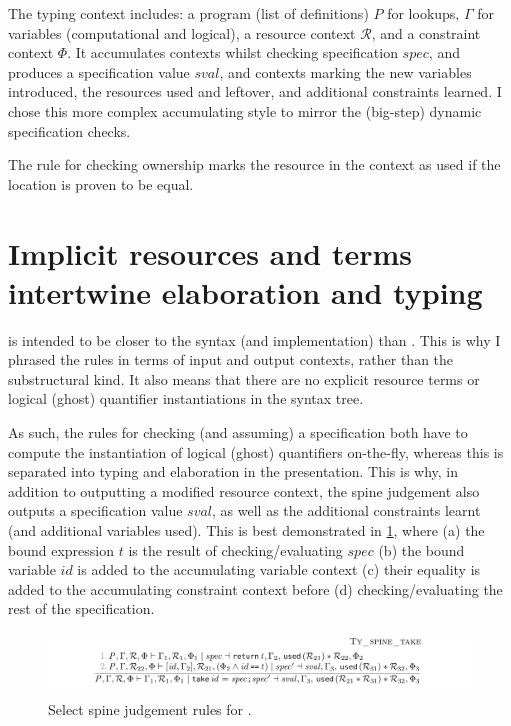 The typing context includes: a program (list of definitions) $P$ for lookups,
$\Gamma$ for variables (computational and logical), a resource context
$\mathcal{R}$, and a constraint context $\Phi$. It accumulates contexts whilst
checking specification $\mathit{spec}$, and produces a specification value
$\mathit{sval}$, and contexts marking the new variables introduced, the
resources used and leftover, and additional constraints learned. I chose this
more complex accumulating style to mirror the (big-step) dynamic specification
checks.

The rule for checking ownership marks the resource in the context as
used if the location is proven to be equal.

\section{Implicit resources and terms intertwine elaboration and typing}

 is intended to be closer to the syntax (and implementation)
than . This is why I phrased the rules in terms of input and
output contexts, rather than the substructural kind. It also means that there
are no explicit resource terms or logical (ghost) quantifier instantiations in
the syntax tree.

As such, the rules for checking (and assuming) a specification both have to
compute the instantiation of logical (ghost) quantifiers on-the-fly, whereas
this is separated into typing and elaboration in the 
presentation. This is why, in addition to outputting a modified resource
context, the spine judgement also outputs a specification value
$\mathit{sval}$, as well as the additional constraints learnt (and additional
variables used). This is best demonstrated in \cref{fig:minicn-spine-take},
where (a) the bound expression $\mathit{t}$ is the result of
checking/evaluating $\mathit{spec}$ (b) the bound variable $\mathit{id}$ is
added to the accumulating variable context (c) their equality is added to the
accumulating constraint context before (d) checking/evaluating the rest of the
specification.

\begin{figure}[tpb]
    \ContinuedFloat{}
    \includegraphics{figures/minicn-spine-3}
    \caption{Select spine judgement rules for .}\label{fig:minicn-spine-take}
\end{figure}

